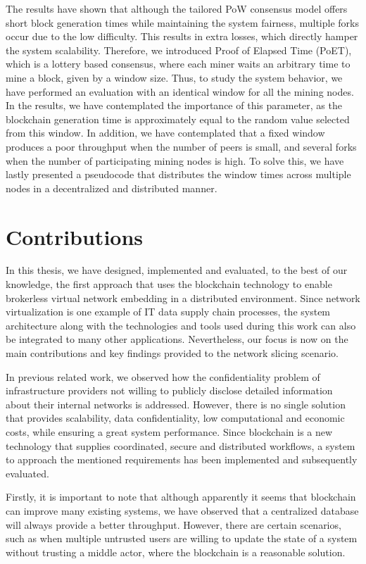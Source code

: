 The results have shown that although the tailored PoW consensus model offers short block generation times while maintaining the system fairness, multiple forks occur due to the low difficulty. This results in extra losses, which directly hamper the system scalability. Therefore, we introduced Proof of Elapsed Time (PoET), which is a lottery based consensus, where each miner waits an arbitrary time to mine a block, given by a window size. Thus, to study the system behavior, we have performed an evaluation with an identical window for all the mining nodes. In the results, we have contemplated the importance of this parameter, as the blockchain generation time is approximately equal to the random value selected from this window. In addition, we have contemplated that a fixed window produces a poor throughput when the number of peers is small, and several forks when the number of participating mining nodes is high. To solve this, we have lastly presented a pseudocode that distributes the window times across multiple nodes in a decentralized and distributed manner.

\section{Contributions}

In this thesis, we have designed, implemented and evaluated, to the best of our knowledge, the first approach that uses the blockchain technology to enable brokerless virtual network embedding in a distributed environment. Since network virtualization is one example of IT data supply chain processes, the system architecture along with the technologies and tools used during this work can also be integrated to many other applications. Nevertheless, our focus is now on the main contributions and key findings provided to the network slicing scenario.

In previous related work, we observed how the confidentiality problem of infrastructure providers not willing to publicly disclose detailed information about their internal networks is addressed. However, there is no single solution that provides scalability, data confidentiality, low computational and economic costs, while ensuring a great system performance. Since blockchain is a new technology that supplies coordinated, secure and distributed workflows, a system to approach the mentioned requirements has been implemented and subsequently evaluated.

Firstly, it is important to note that although apparently it seems that blockchain can improve many existing systems, we have observed that a centralized database will always provide a better throughput. However, there are certain scenarios, such as when multiple untrusted users are willing to update the state of a system without trusting a middle actor, where the blockchain is a reasonable solution.

